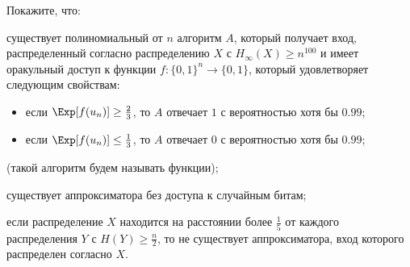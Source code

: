 Покажите, что:
\begin{enumcyr}
    \item существует полиномиальный от $n$ алгоритм $A$, который получает вход, распределенный согласно
        распределению $X$ с $H_{\infty}(X) \ge n^{100}$ и имеет оракульный доступ к функции
        $f\colon \{0, 1\}^n \to  \{0, 1\}$, который  удовлетворяет следующим свойствам:
        \begin{itemize}
            \item если $\Exp[f(u_n)] \ge \frac{2}{3}$, то $A$ отвечает $1$ с вероятностью хотя бы $0.99$;
            \item если $\Exp[f(u_n)] \le \frac{1}{3}$, то $A$ отвечает $0$ с вероятностью хотя бы $0.99$;
        \end{itemize}
        (такой алгоритм будем называть  функции);
    \item существует аппроксиматора без доступа к случайным битам;
    \item если распределение $X$ находится на расстоянии более $\frac{1}{5}$ от каждого распределения $Y$
        с $H(Y) \ge \frac{n}{2}$, то не существует аппроксиматора, вход которого распределен согласно $X$.
\end{enumcyr}